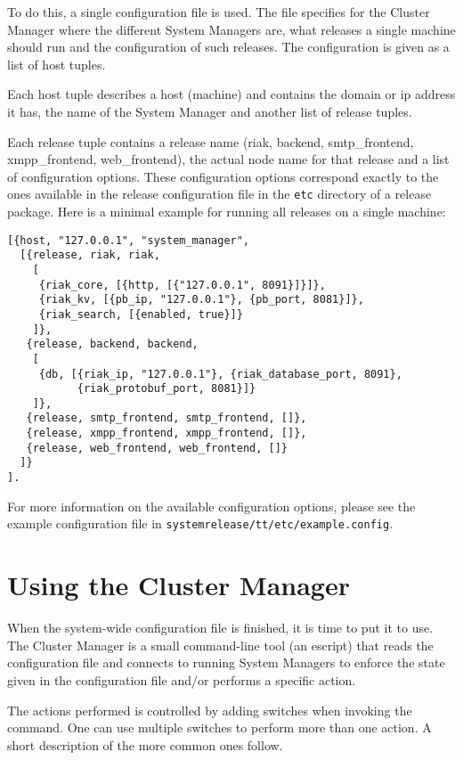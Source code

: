 \documentclass[11pt,a4paper]{report}
\begin{document}
To do this, a single configuration file is used. The file specifies for the
Cluster Manager where the different System Managers are, what releases a single
machine should run and the configuration of such releases. The configuration is
given as a list of host tuples.

Each host tuple describes a host (machine) and contains the domain or ip address
it has, the name of the System Manager and another list of release tuples.

Each release tuple contains a release name (riak, backend, smtp\_frontend,
xmpp\_frontend, web\_frontend), the actual node name for that release and a list
of configuration options. These configuration options correspond exactly to the
ones available in the release configuration file in the {\tt etc} directory of a
release package. Here is a minimal example for running all releases on a single
machine:

\begin{Verbatim}[samepage=true]
[{host, "127.0.0.1", "system_manager",
  [{release, riak, riak,
    [
     {riak_core, [{http, [{"127.0.0.1", 8091}]}]},
     {riak_kv, [{pb_ip, "127.0.0.1"}, {pb_port, 8081}]},
     {riak_search, [{enabled, true}]}
    ]},
   {release, backend, backend,
    [
     {db, [{riak_ip, "127.0.0.1"}, {riak_database_port, 8091},
           {riak_protobuf_port, 8081}]}
    ]},
   {release, smtp_frontend, smtp_frontend, []},
   {release, xmpp_frontend, xmpp_frontend, []},
   {release, web_frontend, web_frontend, []}
  ]}
].
\end{Verbatim}

\begin{sloppypar}
For more information on the available configuration options, please see the
example configuration file in {\tt system\-release/tt/etc/example.config}.
\end{sloppypar}
\section{Using the Cluster Manager}
When the system-wide configuration file is finished, it is time to put it to
use. The Cluster Manager is a small command-line tool (an escript) that reads
the configuration file and connects to running System Managers to enforce the
state given in the configuration file and/or performs a specific action.

The actions performed is controlled by adding switches when invoking the
command. One can use multiple switches to perform more than one action. A short
description of the more common ones follow.
\end{document}

